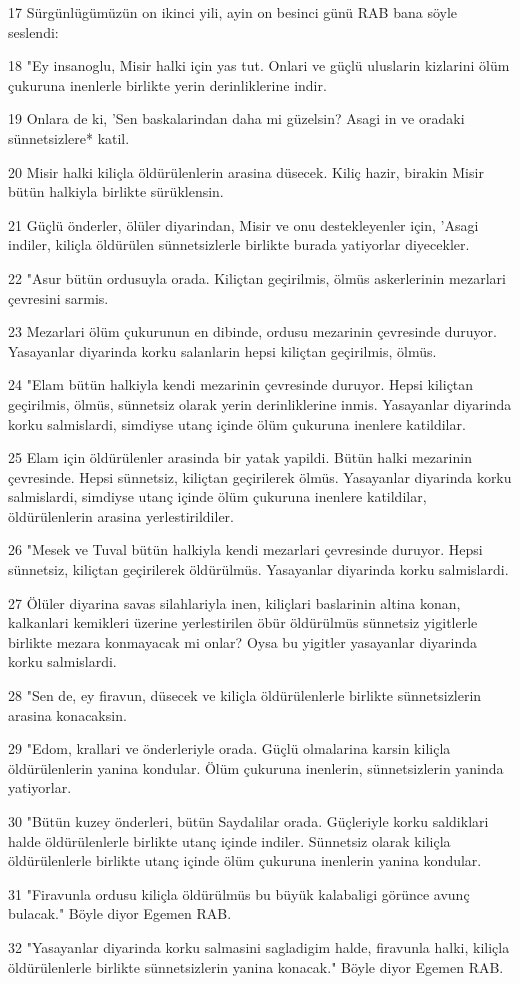 \par 17 Sürgünlügümüzün on ikinci yili, ayin on besinci günü RAB bana söyle seslendi:
\par 18 "Ey insanoglu, Misir halki için yas tut. Onlari ve güçlü uluslarin kizlarini ölüm çukuruna inenlerle birlikte yerin derinliklerine indir.
\par 19 Onlara de ki, 'Sen baskalarindan daha mi güzelsin? Asagi in ve oradaki sünnetsizlere* katil.
\par 20 Misir halki kiliçla öldürülenlerin arasina düsecek. Kiliç hazir, birakin Misir bütün halkiyla birlikte sürüklensin.
\par 21 Güçlü önderler, ölüler diyarindan, Misir ve onu destekleyenler için, 'Asagi indiler, kiliçla öldürülen sünnetsizlerle birlikte burada yatiyorlar diyecekler.
\par 22 "Asur bütün ordusuyla orada. Kiliçtan geçirilmis, ölmüs askerlerinin mezarlari çevresini sarmis.
\par 23 Mezarlari ölüm çukurunun en dibinde, ordusu mezarinin çevresinde duruyor. Yasayanlar diyarinda korku salanlarin hepsi kiliçtan geçirilmis, ölmüs.
\par 24 "Elam bütün halkiyla kendi mezarinin çevresinde duruyor. Hepsi kiliçtan geçirilmis, ölmüs, sünnetsiz olarak yerin derinliklerine inmis. Yasayanlar diyarinda korku salmislardi, simdiyse utanç içinde ölüm çukuruna inenlere katildilar.
\par 25 Elam için öldürülenler arasinda bir yatak yapildi. Bütün halki mezarinin çevresinde. Hepsi sünnetsiz, kiliçtan geçirilerek ölmüs. Yasayanlar diyarinda korku salmislardi, simdiyse utanç içinde ölüm çukuruna inenlere katildilar, öldürülenlerin arasina yerlestirildiler.
\par 26 "Mesek ve Tuval bütün halkiyla kendi mezarlari çevresinde duruyor. Hepsi sünnetsiz, kiliçtan geçirilerek öldürülmüs. Yasayanlar diyarinda korku salmislardi.
\par 27 Ölüler diyarina savas silahlariyla inen, kiliçlari baslarinin altina konan, kalkanlari kemikleri üzerine yerlestirilen öbür öldürülmüs sünnetsiz yigitlerle birlikte mezara konmayacak mi onlar? Oysa bu yigitler yasayanlar diyarinda korku salmislardi.
\par 28 "Sen de, ey firavun, düsecek ve kiliçla öldürülenlerle birlikte sünnetsizlerin arasina konacaksin.
\par 29 "Edom, krallari ve önderleriyle orada. Güçlü olmalarina karsin kiliçla öldürülenlerin yanina kondular. Ölüm çukuruna inenlerin, sünnetsizlerin yaninda yatiyorlar.
\par 30 "Bütün kuzey önderleri, bütün Saydalilar orada. Güçleriyle korku saldiklari halde öldürülenlerle birlikte utanç içinde indiler. Sünnetsiz olarak kiliçla öldürülenlerle birlikte utanç içinde ölüm çukuruna inenlerin yanina kondular.
\par 31 "Firavunla ordusu kiliçla öldürülmüs bu büyük kalabaligi görünce avunç bulacak." Böyle diyor Egemen RAB.
\par 32 "Yasayanlar diyarinda korku salmasini sagladigim halde, firavunla halki, kiliçla öldürülenlerle birlikte sünnetsizlerin yanina konacak." Böyle diyor Egemen RAB.


